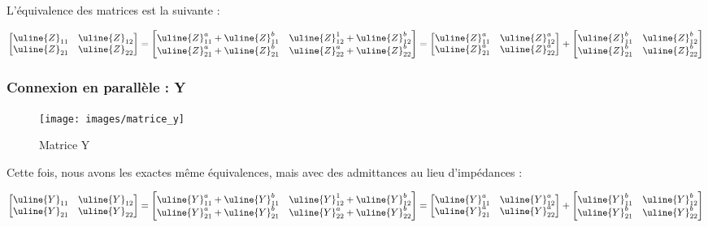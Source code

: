 \documentclass[12pt,a4paper]{article}
\newcommand{\uz}{\uline{Z} }
\newcommand{\uy}{\uline{Y} }
\begin{document}
L'équivalence des matrices est la suivante :

\begin{equation}
\begin{bmatrix}
	\uz_{11} & \uz_{12}\\
	\uz_{21} & \uz_{22}
\end{bmatrix} = \begin{bmatrix}
	\uz_{11}^a + \uz_{11}^b & \uz_{12}^1 + \uz_{12}^b\\
	\uz_{21}^a + \uz_{21}^b & \uz_{22}^a + \uz_{22}^b
\end{bmatrix} = \begin{bmatrix}
	\uz_{11}^a & \uz_{12}^a\\
	\uz_{21}^a & \uz_{22}^a
\end{bmatrix} + \begin{bmatrix}
	\uz_{11}^b & \uz_{12}^b\\
	\uz_{21}^b & \uz_{22}^b
\end{bmatrix}
\end{equation}


\subsubsection{Connexion en parallèle : Y}
\begin{figure}[!h]
	\centering
	\texttt{[image: images/matrice\_y]}
	\caption{Matrice Y}
\end{figure}
Cette fois, nous avons les exactes même équivalences, mais avec des admittances au lieu d'impédances :

\begin{equation}
\begin{bmatrix}
	\uy_{11} & \uy_{12}\\
	\uy_{21} & \uy_{22}
\end{bmatrix} = \begin{bmatrix}
	\uy_{11}^a + \uy_{11}^b & \uy_{12}^1 + \uy_{12}^b\\
	\uy_{21}^a + \uy_{21}^b & \uy_{22}^a + \uy_{22}^b
\end{bmatrix} = \begin{bmatrix}
	\uy_{11}^a & \uy_{12}^a\\
	\uy_{21}^a & \uy_{22}^a
\end{bmatrix} + \begin{bmatrix}
	\uy_{11}^b & \uy_{12}^b\\
	\uy_{21}^b & \uy_{22}^b
\end{bmatrix}
\end{equation}
\end{document}
